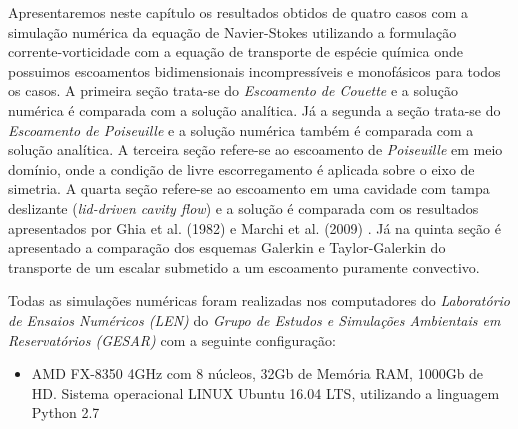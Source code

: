 Apresentaremos neste capítulo os resultados obtidos
de quatro casos com a simulação numérica da equação de Navier-Stokes
utilizando a formulação corrente-vorticidade 
com a equação de transporte de espécie química onde
possuimos escoamentos bidimensionais incompressíveis e monofásicos
para todos os casos.
A primeira seção trata-se do \textit{Escoamento de Couette} e a solução
numérica é comparada com a solução analítica.
Já a segunda a seção trata-se do \textit{Escoamento de Poiseuille} e
a solução numérica também é comparada com a solução analítica.
A terceira seção refere-se ao escoamento de \textit{Poiseuille} 
em meio domínio, onde a condição de livre escorregamento é aplicada
sobre o eixo de simetria.
A quarta seção refere-se ao escoamento em uma cavidade com tampa deslizante
(\textit{lid-driven cavity flow}) e
a solução é comparada com os resultados apresentados por Ghia et al. (1982) \cite{ghia1982} e Marchi et al. (2009) \cite{marchi2009}. 
Já na quinta seção é apresentado a comparação dos 
esquemas Galerkin e Taylor-Galerkin do transporte de
um escalar submetido a um escoamento puramente convectivo.

\medskip
Todas as simulações numéricas foram realizadas nos computadores do \textit{Laboratório
de Ensaios Numéricos (LEN)} do \textit{Grupo de Estudos e Simulações
Ambientais em Reservatórios (GESAR)} com a seguinte configuração:

\begin{itemize}
 \item AMD FX-8350 4GHz com 8 núcleos, 32Gb de Memória RAM, 1000Gb de HD.
       Sistema operacional LINUX Ubuntu 16.04 LTS, utilizando a linguagem Python 2.7 
\end{itemize}
